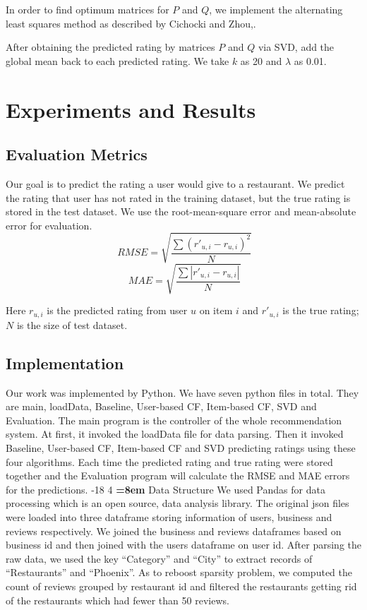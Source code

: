 \documentclass{llncs}
\makeatletter
\renewcommand\subsubsection{\@startsection{subsubsection}{3}{\z@}%
	{-18\p@ \@plus -4\p@ \@minus -4\p@}%
	{4\p@ \@plus 2\p@ \@minus 2\p@}%
	{\normalfont\normalsize\bfseries\boldmath
		\rightskip=\z@ \@plus 8em\pretolerance=10000 }}
\makeatother
\begin{document}
In order to find optimum matrices for $P$ and $Q$, we implement the alternating least squares method as described by Cichocki and Zhou\cite{abc},\cite{zhou}.

After obtaining the predicted rating by matrices $P$ and $Q$ via SVD, add the global mean back to each predicted rating. We take $k$ as 20 and $\lambda$ as 0.01.

\section{Experiments and Results}
%
\subsection{Evaluation Metrics}
Our goal is to predict the rating a user would give to a restaurant. We predict the rating that user has not rated in the training dataset, but the true rating is stored in the test dataset. We use the root-mean-square error and mean-absolute error for evaluation.
\begin{equation}
\ RMSE = \sqrt{\frac{\sum{\left(r'_{u,i} - r_{u,i}\right)}^2}{N}}
\end{equation}
\begin{equation}
\ MAE = \sqrt{\frac{\sum{\left|r'_{u,i} - r_{u,i}\right|}}{N}}
\end{equation}

Here $r_{u,i}$ is the predicted rating from user $u$ on item $i$ and $r'_{u,i}$ is the true rating; $N$ is the size of test dataset. 
\subsection{Implementation}
Our work was implemented by Python. We have seven python files in total. They are main, loadData, Baseline, User-based CF, Item-based CF, SVD and Evaluation. The main program is the controller of the whole recommendation system. At first, it invoked the loadData file for data parsing. Then it invoked Baseline, User-based CF, Item-based CF and SVD predicting ratings using these four algorithms. Each time the predicted rating and true rating were stored together and the Evaluation program will calculate the RMSE and MAE errors for the predictions. 
\subsubsection{Data Structure}
We used Pandas for data processing which is an open source, data analysis library. The original json files were loaded into three dataframe storing information of users, business and reviews respectively. We joined the business and reviews dataframes based on business id and then joined with the users dataframe on user id. After parsing the raw data, we used the key “Category” and “City” to extract records of “Restaurants” and “Phoenix”. As to reboost sparsity problem, we computed the count of reviews grouped by restaurant id and filtered the restaurants getting rid of the restaurants which had fewer than 50 reviews. 
\end{document}
